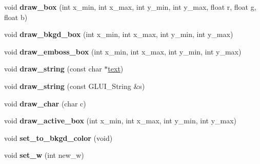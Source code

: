 \begin{DoxyCompactItemize}
\item 
\hypertarget{classGLUI__Control_a5dff8194089a66651d3729cf7c465644}{void {\bfseries draw\-\_\-box} (int x\-\_\-min, int x\-\_\-max, int y\-\_\-min, int y\-\_\-max, float r, float g, float b)}\label{classGLUI__Control_a5dff8194089a66651d3729cf7c465644}

\item 
\hypertarget{classGLUI__Control_ad1bcdb980c0ccbcbafd7b51a6564ccc0}{void {\bfseries draw\-\_\-bkgd\-\_\-box} (int x\-\_\-min, int x\-\_\-max, int y\-\_\-min, int y\-\_\-max)}\label{classGLUI__Control_ad1bcdb980c0ccbcbafd7b51a6564ccc0}

\item 
\hypertarget{classGLUI__Control_a1386b942473e028e9204bd1a28e83a6d}{void {\bfseries draw\-\_\-emboss\-\_\-box} (int x\-\_\-min, int x\-\_\-max, int y\-\_\-min, int y\-\_\-max)}\label{classGLUI__Control_a1386b942473e028e9204bd1a28e83a6d}

\item 
\hypertarget{classGLUI__Control_a05172f3645ac042839036c97e04ea819}{void {\bfseries draw\-\_\-string} (const char $\ast$\hyperlink{classGLUI__Control_af0d60e9736f4dbc34e9a536e75876d72}{text})}\label{classGLUI__Control_a05172f3645ac042839036c97e04ea819}

\item 
\hypertarget{classGLUI__Control_aba5d462fcca0297c3dbf6a26d0774e4a}{void {\bfseries draw\-\_\-string} (const G\-L\-U\-I\-\_\-\-String \&s)}\label{classGLUI__Control_aba5d462fcca0297c3dbf6a26d0774e4a}

\item 
\hypertarget{classGLUI__Control_af8bfdf4867b4521fd3c12825e8a150db}{void {\bfseries draw\-\_\-char} (char c)}\label{classGLUI__Control_af8bfdf4867b4521fd3c12825e8a150db}

\item 
\hypertarget{classGLUI__Control_aa61812303961384f999c35f128f04c93}{void {\bfseries draw\-\_\-active\-\_\-box} (int x\-\_\-min, int x\-\_\-max, int y\-\_\-min, int y\-\_\-max)}\label{classGLUI__Control_aa61812303961384f999c35f128f04c93}

\item 
\hypertarget{classGLUI__Control_a091c0c095827c3270b442d9bd3542d50}{void {\bfseries set\-\_\-to\-\_\-bkgd\-\_\-color} (void)}\label{classGLUI__Control_a091c0c095827c3270b442d9bd3542d50}

\item 
\hypertarget{classGLUI__Control_a7f9dde76de0e5fd660dc43695b40c91d}{void {\bfseries set\-\_\-w} (int new\-\_\-w)}\label{classGLUI__Control_a7f9dde76de0e5fd660dc43695b40c91d}


\end{DoxyCompactItemize}
